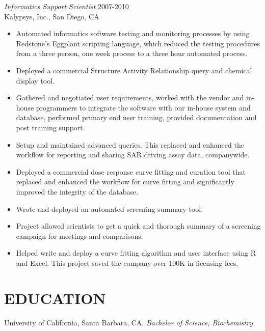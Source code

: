 \documentclass[margin, 10pt]{res} %
\begin{document}
\begin{resume}
{\sl Informatics Support Scientist} \hfill 2007-2010 \\
Kalypsys, Inc., San Diego, CA 
\begin{itemize}
\item Automated informatics software testing and monitoring processes by using Redstone’s Eggplant scripting language, which reduced the testing procedures from a three person, one week process to a three hour automated process.
\item Deployed a commercial Structure Activity Relationship query and chemical display tool.
\item Gathered and negotiated user requirements, worked with the vendor and in-house programmers to integrate the software with our in-house system and database, performed primary end user training, provided documentation and post training support.
\item Setup and maintained advanced queries. This replaced and enhanced the workflow for reporting and sharing SAR driving assay data, companywide.
\item Deployed a commercial dose response curve fitting and curation tool that replaced and enhanced the workflow for curve fitting and significantly improved the integrity of the database.
\item Wrote and deployed an automated screening summary tool.
\item Project allowed scientists to get a quick and thorough summary of a screening campaign for meetings and comparisons.
\item Helped write and deploy a curve fitting algorithm and user interface using R and Excel. This project saved the company over 100K in licensing fees.
\end{itemize} 



\section{EDUCATION}

University of California, Santa Barbara, CA, {\sl Bachelor of Science, Biochemistry}



\end{resume}
\end{document}
